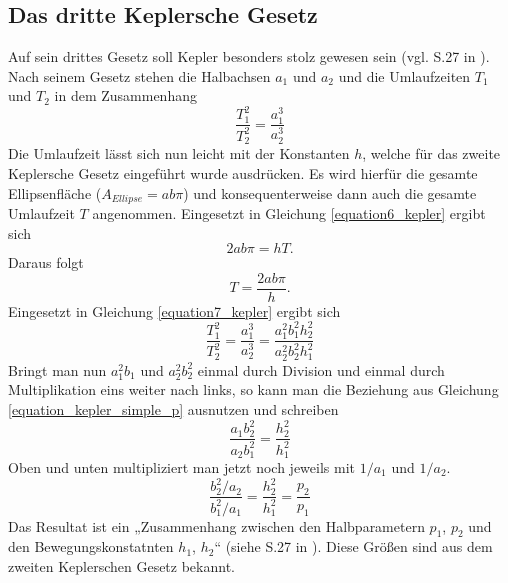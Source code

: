 \subsection{Das dritte Keplersche Gesetz}
Auf sein drittes Gesetz soll Kepler besonders stolz gewesen sein (vgl. S.27 in \cite{Raumflugm}). Nach seinem Gesetz stehen die Halbachsen \ensuremath{a_1} und \ensuremath{a_2} und die Umlaufzeiten \ensuremath{T_1} und \ensuremath{T_2} in dem Zusammenhang
\begin{equation}
	\frac{T_1^2}{T_2^2}=\frac{a_1^3}{a_2^3}
	\label{equation7_kepler}
\end{equation} 
Die Umlaufzeit lässt sich nun leicht mit der Konstanten \ensuremath{h}, welche für das zweite Keplersche Gesetz eingeführt wurde ausdrücken. Es wird hierfür die gesamte Ellipsenfläche (\ensuremath{A_{Ellipse}=ab\pi}) und konsequenterweise dann auch die gesamte Umlaufzeit \ensuremath{T} angenommen. Eingesetzt in Gleichung \ref{equation6_kepler} ergibt sich
\begin{equation}
	2ab\pi=hT.
\end{equation} 
Daraus folgt
\begin{equation}
	T=\frac{2ab\pi}{h}.
\end{equation}
Eingesetzt in Gleichung \ref{equation7_kepler} ergibt sich 
\begin{equation}
		\frac{T_1^2}{T_2^2}=\frac{a_1^3}{a_2^3}=\frac{a_1^2b_1^2h_2^2}{a_2^2b_2^2h_1^2}
\end{equation}
Bringt man nun \ensuremath{a_1^2b_1} und \ensuremath{a_2^2b_2^2} einmal durch Division und einmal durch Multiplikation eins weiter nach links, so kann man die Beziehung aus Gleichung \ref{equation_kepler_simple_p} ausnutzen und schreiben
\begin{equation}
\frac{a_1b_2^2}{a_2b_1^2}=\frac{h_2^2}{h_1^2}
\end{equation}
Oben und unten multipliziert man jetzt noch jeweils mit \ensuremath{1/a_1} und \ensuremath{1/a_2}.
\begin{equation}
\frac{b_2^2/a_2}{b_1^2/a_1}=\frac{h_2^2}{h_1^2}=\frac{p_2}{p_1}
\end{equation}
Das Resultat ist ein „Zusammenhang zwischen den Halbparametern \ensuremath{p_1}, \ensuremath{p_2} und den Bewegungskonstatnten \ensuremath{h_1}, \ensuremath{h_2}“ (siehe S.27 in \cite{Raumflugm}). Diese Größen sind aus dem zweiten Keplerschen Gesetz bekannt. 
